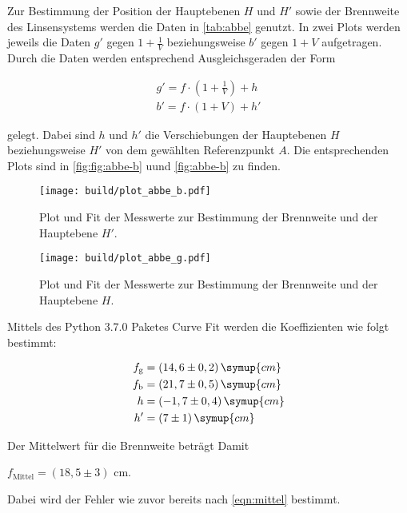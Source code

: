 

Zur Bestimmung der Position der Hauptebenen $H$ und $H'$ sowie der Brennweite des Linsensystems werden die Daten in \autoref{tab:abbe} genutzt.
In zwei Plots werden jeweils die Daten $g'$ gegen $1 + \frac{1}{V}$ beziehungsweise $b'$ gegen $1 + V$ aufgetragen.
Durch die Daten werden entsprechend Ausgleichsgeraden der Form

\begin{align}
  g' = f \cdot (1 + \frac{1}{V}) + h\\
  b' = f \cdot (1 + V) + h'
\end{align}

gelegt. Dabei sind $h$ und $h'$ die Verschiebungen der Hauptebenen $H$ beziehungsweise $H'$ von dem gewählten Referenzpunkt $A$.
Die entsprechenden Plots sind in \autoref{fig:fig:abbe-b} uund \autoref{fig:abbe-b} zu finden.

\begin{figure}
  \centering
  \texttt{[image: build/plot\_abbe\_b.pdf]}
  \caption{Plot und Fit der Messwerte zur Bestimmung der Brennweite und der Hauptebene $H'$.}
  \label{fig:abbe-b}
\end{figure}

\begin{figure}
  \centering
  \texttt{[image: build/plot\_abbe\_g.pdf]}
  \caption{Plot und Fit der Messwerte zur Bestimmung der Brennweite und der Hauptebene $H$.}
  \label{fig:abbe-g}
\end{figure}

Mittels des Python 3.7.0 Paketes Curve Fit werden die Koeffizienten wie folgt bestimmt:

\begin{align*}
  f_\text{g} &= (14,6 \pm 0,2) \, \symup{cm}\\
  f_\text{b} &= (21,7 \pm 0,5) \, \symup{cm}\\
  h  &= (-1,7 \pm 0,4) \, \symup{cm}\\
  h' &= (7 \pm 1) \, \symup{cm}
\end{align*}

Der Mittelwert für die Brennweite beträgt Damit

\begin{center}
  $f_\text{Mittel} = (18,5 \pm 3)$ cm.
\end{center}

Dabei wird der Fehler wie zuvor bereits nach \eqref{eqn:mittel} bestimmt.